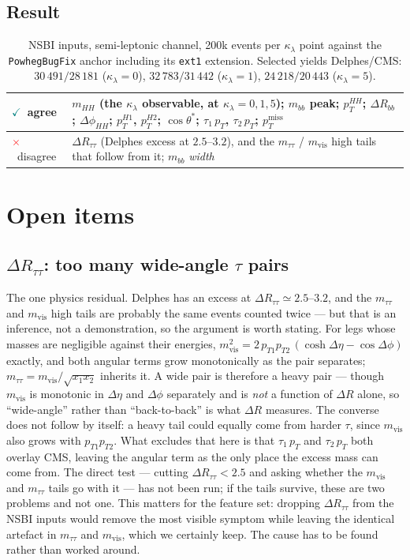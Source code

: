 \documentclass[11pt,a4paper]{article}
\newcommand{\mtautau}{m_{\tau\tau}}
\newcommand{\mvis}{m_{\mathrm{vis}}}
\newcommand{\kl}{\kappa_{\lambda}}
\newcommand{\dR}{\Delta R}
\newcommand{\ptmiss}{p_{T}^{\mathrm{miss}}}
\newcommand{\yes}{\textcolor{teal}{$\checkmark$}}
\newcommand{\no}{\textcolor{red}{$\times$}}
\begin{document}
\subsection{Result}

\begin{table}[htbp]
\centering\small
\begin{tabular}{lp{11.3cm}}
\toprule
\yes\ agree & $m_{HH}$ (the $\kl$ observable, at $\kl=0,1,5$); $m_{bb}$ peak;
$p_{T}^{HH}$; $\dR_{bb}$; $\Delta\phi_{HH}$; $p_{T}^{H1}$, $p_{T}^{H2}$;
$\cos\theta^{*}$; $\tau_{1}\,p_{T}$, $\tau_{2}\,p_{T}$; $\ptmiss$ \\
\midrule
\no\ disagree & $\dR_{\tau\tau}$ (Delphes excess at $2.5$--$3.2$), and the $\mtautau$ /
$\mvis$ high tails that follow from it; $m_{bb}$ \emph{width} \\
\bottomrule
\end{tabular}
\caption{NSBI inputs, semi-leptonic channel, 200k events per $\kl$ point against the
\texttt{PowhegBugFix} anchor including its \texttt{ext1} extension. Selected yields
Delphes/CMS: $30\,491/28\,181$ ($\kl=0$), $32\,783/31\,442$ ($\kl=1$), $24\,218/20\,443$
($\kl=5$).\label{tab:features}}
\end{table}

\section{Open items}

\subsection{$\dR_{\tau\tau}$: too many wide-angle $\tau$ pairs}
\label{sec:drtautau}

The one physics residual. Delphes has an excess at $\dR_{\tau\tau}\simeq2.5$--$3.2$, and
the $\mtautau$ and $\mvis$ high tails are probably the same events counted twice --- but
that is an inference, not a demonstration, so the argument is worth stating. For legs whose
masses are negligible against their energies,
$\mvis^{2}=2\,p_{T1}p_{T2}\,(\cosh\Delta\eta-\cos\Delta\phi)$ exactly, and both
angular terms grow monotonically as the pair separates; $\mtautau=\mvis/\sqrt{x_{1}x_{2}}$
inherits it. A wide pair is therefore a heavy pair --- though $\mvis$ is monotonic in
$\Delta\eta$ and $\Delta\phi$ separately and is \emph{not} a function of $\dR$ alone, so
``wide-angle'' rather than ``back-to-back'' is what $\dR$ measures. The converse does not
follow by itself: a heavy tail could equally come from harder $\tau$, since $\mvis$ also
grows with $p_{T1}p_{T2}$. What excludes that here is that $\tau_{1}\,p_{T}$ and
$\tau_{2}\,p_{T}$ both overlay CMS, leaving the angular term as the only place the excess
mass can come from. The direct test --- cutting $\dR_{\tau\tau}<2.5$ and asking whether the
$\mvis$ and $\mtautau$ tails go with it --- has not been run; if the tails survive, these
are two problems and not one. This matters for the feature set: dropping
$\dR_{\tau\tau}$ from the NSBI inputs would remove the most visible symptom while leaving
the identical artefact in $\mtautau$ and $\mvis$, which we certainly keep. The cause has to
be found rather than worked around.
\end{document}
